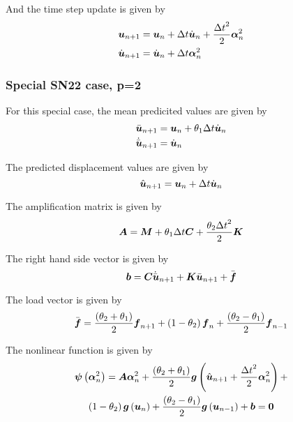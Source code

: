 And the time step update is given by
\begin{equation}
  \begin{split}
     \boldsymbol{u} _{n+1} &=  \boldsymbol{u} _{n}+\Delta t\dot{ \boldsymbol{u} }_{n} +\dfrac{{\Delta t}^{2}}{2} \boldsymbol{\alpha} ^{2}_{n} \\
    \dot{ \boldsymbol{u} }_{n+1} &= \dot{ \boldsymbol{u} }_{n}+\Delta t \boldsymbol{\alpha} ^{2}_{n}
  \end{split}
\end{equation}

\subsubsection{Special SN22 case, p=2}

For this special case, the mean predicited values are given by
\begin{equation}
  \begin{split}
    \bar{ \boldsymbol{u} }_{n+1} &=  \boldsymbol{u} _{n}+\theta_{1}\Delta t\dot{ \boldsymbol{u} }_{n}\\
    \dot{\bar{ \boldsymbol{u} }}_{n+1} &= \dot{ \boldsymbol{u} }_{n}
  \end{split}
\end{equation}

The predicted displacement values are given by
\begin{equation}
   \hat{ \boldsymbol{u} }_{n+1} =  \boldsymbol{u} _{n}+\Delta t\dot{ \boldsymbol{u} }_{n}
\end{equation}

The amplification matrix is given by
\begin{equation}
  \matr{A}=\matr{M}+\theta_{1}\Delta t\matr{C}+\dfrac{\theta_{2}{\Delta t}^{2}}{2}\matr{K}
\end{equation}

The right hand side vector is given by
\begin{equation}
  \vectr{b}=\matr{C}\dot{\bar{\vectr{u}}}_{n+1}+\matr{K}\bar{\vectr{u}}_{n+1}+\bar{\vectr{f}}
\end{equation}

The load vector is given by
\begin{equation}
  \bar{ \boldsymbol{f} }=\dfrac{\left( \theta_{2}+\theta_{1} \right)}{2} \boldsymbol{f} _{n+1}+\left( 1-\theta_{2} \right) \boldsymbol{f} _{n}
  +\dfrac{\left( \theta_{2}-\theta_{1} \right)}{2} \boldsymbol{f} _{n-1}
\end{equation}

The nonlinear function is given by
\begin{multline}
  \fnof{\vectr{\psi}}{\vectr{\alpha}^{2}_{n}}=\matr{A}\vectr{\alpha}^{2}_{n}+\dfrac{\pbrac{\theta_{2}+\theta_{1}}}{2}\fnof{\vectr{g}}{\hat{\vectr{u}}_{n+1}+
    \dfrac{{\Delta t}^{2}}{2}\vectr{\alpha}^{2}_{n}}+\\
  \pbrac{1-\theta_{2}}\fnof{\vectr{g}}{\vectr{u}_{n}}+\dfrac{\pbrac{\theta_{2}-\theta_{1}}}{2}\fnof{\vectr{g}}{\vectr{u}_{n-1}}+\vectr{b}=\vectr{0}
\end{multline}

